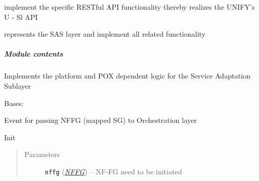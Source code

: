 \documentclass[letterpaper,10pt,english]{sphinxmanual}
\begin{document}
{\hyperref[service/sas_API:escape.service.sas_API.ServiceRequestHandler]{\emph{}}} implement the specific RESTful API functionality
thereby realizes the UNIFY's U - Sl API

{\hyperref[service/sas_API:escape.service.sas_API.ServiceLayerAPI]{\emph{}}} represents the SAS layer and implement all related
functionality


\subparagraph{Module contents}
\label{service/sas_API:module-contents}\label{service/sas_API:module-escape.service.sas_API}
Implements the platform and POX dependent logic for the Service Adaptation
Sublayer

\begin{fulllineitems}
\label{service/sas_API:escape.service.sas_API.InstantiateNFFGEvent}
Bases: 

Event for passing NFFG (mapped SG) to Orchestration layer

\begin{fulllineitems}
\label{service/sas_API:escape.service.sas_API.InstantiateNFFGEvent.__init__}
Init
\begin{quote}\begin{description}
\item[{Parameters}] \leavevmode
\textbf{\texttt{nffg}} ({\hyperref[util/nffg:escape.util.nffg.NFFG]{\emph{\emph{NFFG}}}}) -- NF-FG need to be initiated

\end{description}\end{quote}

\end{fulllineitems}


\end{fulllineitems}

\end{document}
